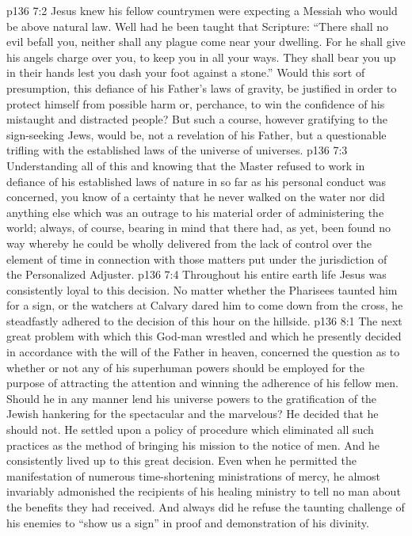 \vs p136 7:2 Jesus knew his fellow countrymen were expecting a Messiah who would be above natural law. Well had he been taught that Scripture: “There shall no evil befall you, neither shall any plague come near your dwelling. For he shall give his angels charge over you, to keep you in all your ways. They shall bear you up in their hands lest you dash your foot against a stone.” Would this sort of presumption, this defiance of his Father’s laws of gravity, be justified in order to protect himself from possible harm or, perchance, to win the confidence of his mistaught and distracted people? But such a course, however gratifying to the sign\hyp{}seeking Jews, would be, not a revelation of his Father, but a questionable trifling with the established laws of the universe of universes.
\vs p136 7:3 \pc Understanding all of this and knowing that the Master refused to work in defiance of his established laws of nature in so far as his personal conduct was concerned, you know of a certainty that he never walked on the water nor did anything else which was an outrage to his material order of administering the world; always, of course, bearing in mind that there had, as yet, been found no way whereby he could be wholly delivered from the lack of control over the element of time in connection with those matters put under the jurisdiction of the Personalized Adjuster.
\vs p136 7:4 Throughout his entire earth life Jesus was consistently loyal to this decision. No matter whether the Pharisees taunted him for a sign, or the watchers at Calvary dared him to come down from the cross, he steadfastly adhered to the decision of this hour on the hillside.
\vs p136 8:1 The next great problem with which this God\hyp{}man wrestled and which he presently decided in accordance with the will of the Father in heaven, concerned the question as to whether or not any of his superhuman powers should be employed for the purpose of attracting the attention and winning the adherence of his fellow men. Should he in any manner lend his universe powers to the gratification of the Jewish hankering for the spectacular and the marvelous? He decided that he should not. He settled upon a policy of procedure which eliminated all such practices as the method of bringing his mission to the notice of men. And he consistently lived up to this great decision. Even when he permitted the manifestation of numerous time\hyp{}shortening ministrations of mercy, he almost invariably admonished the recipients of his healing ministry to tell no man about the benefits they had received. And always did he refuse the taunting challenge of his enemies to “show us a sign” in proof and demonstration of his divinity.
